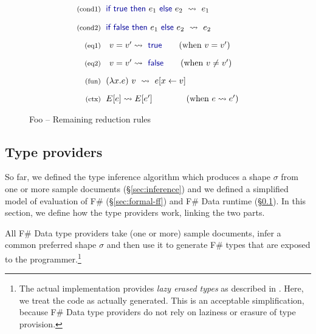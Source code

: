 \documentclass[10pt,preprint,clearpagebib]{sigplanconf}
\newcommand{\kvd}[1]{\textnormal{\textcolor{kvdclr}{\sffamily #1}}}
\newcommand{\reduce}{\rightsquigarrow}
\begin{document}
\begin{figure}
\begin{equation*}
\begin{array}{rl}
 \\[-0.2em]
 \textnormal{\footnotesize{(cond1)}}&
 \hspace{-0.4em}
 \kvd{if}~\kvd{true}~\kvd{then}~e_1~\kvd{else}~e_2 ~\reduce~ e_1 \\
 \\[-0.2em]
 \textnormal{\footnotesize{(cond2)}}&
 \hspace{-0.4em}
 \kvd{if}~\kvd{false}~\kvd{then}~e_1~\kvd{else}~e_2 ~\reduce~ e_2 \\
 \\[-0.3em]
 \textnormal{\footnotesize{(eq1)}}&
 v=v'\reduce\kvd{true} \qquad (\textnormal{when}~v = v')\\
 \\[-0.3em]
 \textnormal{\footnotesize{(eq2)}}&
 v=v'\reduce\kvd{false} \qquad (\textnormal{when}~v \neq v')\\
 \\[-0.3em]
 \textnormal{\footnotesize{(fun)}}&
 \hspace{-0.4em}
 (\lambda x.e)~v ~\reduce~ e[x\leftarrow v] \\
 \\[-0.3em]
 \textnormal{\footnotesize{(ctx)}}&
 \hspace{-0.4em}
  E[e] \reduce E[e'] \qquad\qquad(\textnormal{when}~e \reduce e')\\
\end{array}
\end{equation*}

\caption{Foo -- Remaining reduction rules}
\label{fig:ff-reduction}
\end{figure}


\subsection{Type providers}
\label{sec:formal-tp}

So far, we defined the type inference algorithm which produces a shape $\sigma$ from one 
or more sample documents (\S\ref{sec:inference}) and we defined a simplified model of evaluation
of F\# (\S\ref{sec:formal-ff}) and F\# Data runtime (\S\ref{sec:formal-tp}). In this section, we 
define how the type providers work, linking the two parts.

All F\# Data type providers take (one or more) sample documents, infer a common preferred shape $\sigma$
and then use it to generate F\# types that are exposed to the programmer.\footnote{The actual 
implementation provides \emph{lazy erased types} as described in \cite{fsharp-typeprov}. Here, we treat 
the code as actually generated. This is an acceptable simplification, because F\# Data type providers 
do not rely on laziness or erasure of type provision.}
\end{document}
